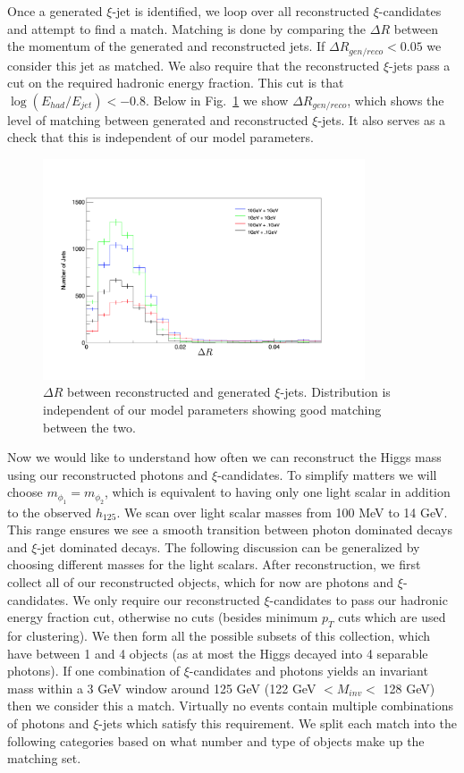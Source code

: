 \documentclass[letter,12pt]{article}
\begin{document}
Once a generated $\xi$-jet is identified, we loop over all reconstructed $\xi$-candidates and attempt to find a match. Matching is done by comparing the $\Delta R$ between the momentum of the generated and reconstructed jets. If $\Delta R_{gen/reco} < 0.05$ we consider this jet as matched. We also require that the reconstructed $\xi$-jets pass a cut on the required hadronic energy fraction. This cut is that $\log(E_{had}/E_{jet}) < -0.8$.  Below in Fig.~\ref{fig:gen_reco} we show $\Delta R_{gen/reco}$, which shows the level of matching between generated and reconstructed $\xi$-jets. It also serves as a check that this is independent of our model parameters. 
\begin{figure}[t]
\begin{center}
\includegraphics[width=0.85\textwidth]{deltaR_gen_reco.png}

\caption{$\Delta R$ between reconstructed and generated $\xi$-jets. Distribution is independent of our model parameters showing good matching between the two.}
\label{fig:gen_reco}
\end{center}
\end{figure}

Now we would like to understand how often we can reconstruct the Higgs mass using our reconstructed photons and $\xi$-candidates. To simplify matters we will choose $m_{\phi_{1}} = m_{\phi_{2}}$, which is equivalent to having only one light scalar in addition to the observed $h_{125}$. We scan over light scalar masses from 100 MeV to 14 GeV. This range ensures we see a smooth transition between photon dominated decays and $\xi$-jet dominated decays. The following discussion can be generalized by choosing different masses for the light scalars. After reconstruction, we first collect all of our reconstructed objects, which for now are photons and $\xi$-candidates. We only require our reconstructed $\xi$-candidates to pass our hadronic energy fraction cut, otherwise no cuts (besides minimum $p_T$ cuts which are used for clustering). We then form all the possible subsets of this collection, which have between 1 and 4 objects (as at most the Higgs decayed into 4 separable photons).  If one combination of $\xi$-candidates and photons yields an invariant mass within a 3 GeV window around 125 GeV (122 GeV $< M_{inv} <$ 128 GeV) then we consider this a match. Virtually no events contain multiple combinations of photons and $\xi$-jets which satisfy this requirement. We split each match into the following categories based on what number and type of objects make up the matching set.
\end{document}
